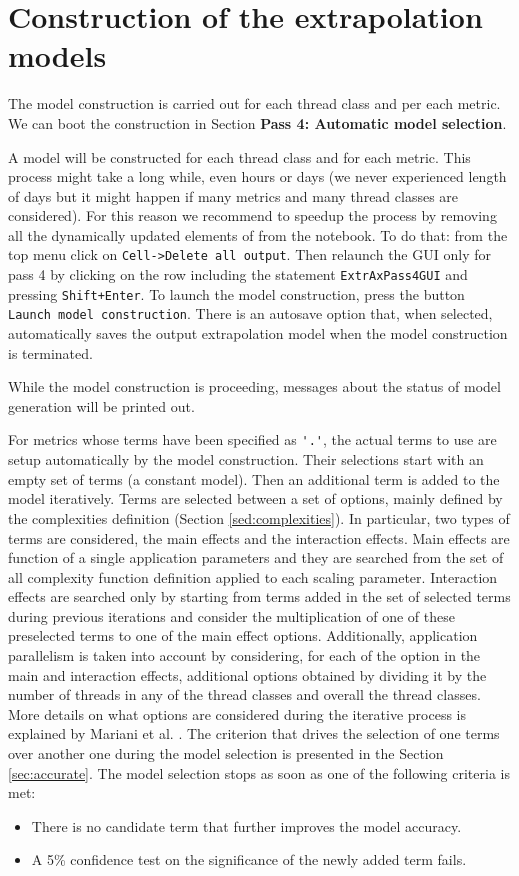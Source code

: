 \documentclass[a4paper, 10pt]{article}
\begin{document}
\section{Construction of the extrapolation models}
\label{sec:construction}

The model construction is carried out for each thread class and per each metric.
We can boot the construction in Section \textbf{Pass 4: Automatic model selection}.

A model will be constructed for each thread class and for each metric. This process might take a long while, even hours or
days (we never experienced length of days but it might happen if many metrics and many thread classes are considered).
For this reason we recommend to speedup the process by removing all the dynamically updated elements of \mathe from the \ex notebook.
To do that: from the top \mathe menu click on \verb!Cell->Delete all output!. Then relaunch the GUI only for pass 4 by clicking on the row
including the statement \verb!ExtrAxPass4GUI! and pressing \verb!Shift+Enter!. To launch the model construction, press the button
\verb!Launch model construction!. There is an autosave option that, when selected, automatically saves the output extrapolation model
when the model construction is terminated.

While the model construction is proceeding, messages about the status of model generation will be printed out.

For metrics whose terms have been specified as \verb!'.'!, the actual terms to use are setup automatically by the model construction.
Their selections start with an empty set of terms (a constant model). Then an additional term is added to the model iteratively.
Terms are selected between a set of options, mainly defined by the complexities definition (Section \ref{sed:complexities}).
In particular, two types of terms are considered, the main effects and the interaction effects. Main effects are function of a single
application parameters and they are searched from the set of all complexity function definition applied to each scaling parameter.
Interaction effects are searched only by starting from terms added in the set of selected terms during previous iterations
and consider the multiplication of one of these preselected terms to one of the main effect options.
Additionally, application parallelism is taken into account by considering, for each of the option in the main and interaction effects,
additional options obtained by dividing it by the number of threads in any of the thread classes and overall the thread classes.
More details on what options are considered during the iterative process is explained by Mariani et al. \cite{mariani2016ijpp}.
The criterion that drives the selection of one terms over another one during the model selection is presented in the Section \ref{sec:accurate}.
The model selection stops as soon as one of the following criteria is met:
\begin{itemize}
 \item There is no candidate term that further improves the model accuracy.
 \item A 5\% confidence test on the significance of the newly added term fails.
\end{itemize}
\end{document}
